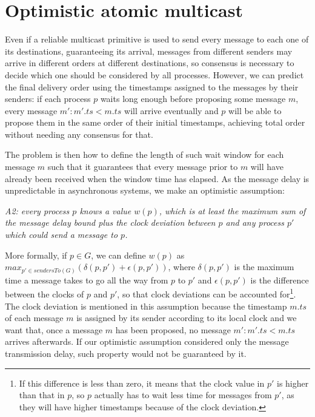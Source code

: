 \documentclass[times, 10pt]{article}
\begin{document}
\section{Optimistic atomic multicast}
\label{sec:optdel}

Even if a reliable multicast primitive is used to send every message to each one of its destinations, guaranteeing its arrival, messages from different senders may arrive in different orders at different destinations, so consensus is necessary to decide which one should be considered by all processes. However, we can predict the final delivery order using the timestamps assigned to the messages by their senders: if each process $p$ waits long enough before proposing some message $m$, every message $m' : m'.ts < m.ts$ will arrive eventually and $p$ will be able to propose them in the same order of their initial timestamps, achieving total order without needing any consensus for that.

The problem is then how to define the length of such wait window for each message $m$ such that it guarantees that every message prior to $m$ will have already been received when the window time has elapsed. As the message delay is unpredictable in asynchronous systems, we make an optimistic assumption:

\begin{center}
\emph{A2: every process $p$ knows a value $w(p)$, which is at least the maximum sum of the message delay bound plus the clock deviation between $p$ and any process $p'$ which could send a message to $p$.}
\end{center}

More formally, if $p \in G$, we can define $w(p)$ as $max_{p' \in sendersTo(G)}(\delta(p,p')+\epsilon(p,p'))$, where $\delta(p,p')$ is the maximum time a message takes to go all the way from $p$ to $p'$ and $\epsilon(p,p')$ is the difference between the clocks of $p$ and $p'$, so that clock deviations can be accounted for\footnote{If this difference is less than zero, it means that the clock value in $p'$ is higher than that in $p$, so $p$ actually has to wait less time for messages from $p'$, as they will have higher timestamps because of the clock deviation.}. The clock deviation is mentioned in this assumption because the timestamp $m.ts$ of each message $m$ is assigned by its sender according to its local clock and we want that, once a message $m$ has been proposed, no message $m' : m'.ts < m.ts$ arrives afterwards. If our optimistic assumption considered only the message transmission delay, such property would not be guaranteed by it.
\end{document}

